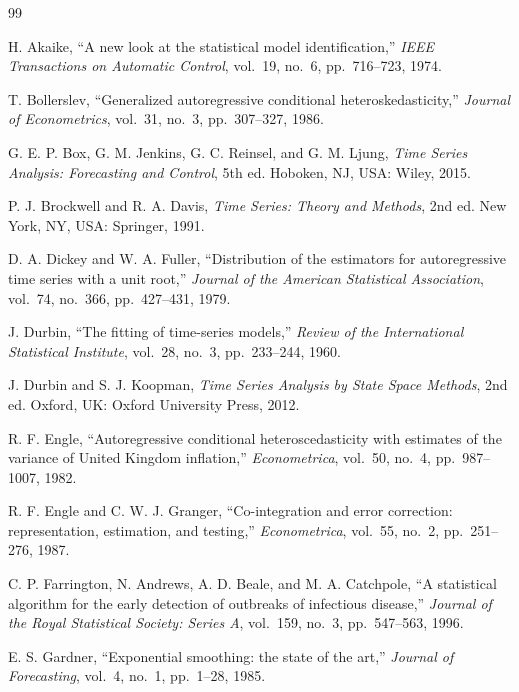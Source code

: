 \documentclass[conference]{IEEEtran}
\theoremstyle{definition}
\begin{document}

\begin{thebibliography}{99}

H. Akaike, ``A new look at the statistical model identification,''
\textit{IEEE Transactions on Automatic Control}, vol.~19, no.~6,
pp.~716--723, 1974.

T. Bollerslev, ``Generalized autoregressive conditional heteroskedasticity,''
\textit{Journal of Econometrics}, vol.~31, no.~3, pp.~307--327, 1986.

G. E. P. Box, G. M. Jenkins, G. C. Reinsel, and G. M. Ljung,
\textit{Time Series Analysis: Forecasting and Control}, 5th ed.
Hoboken, NJ, USA: Wiley, 2015.

P. J. Brockwell and R. A. Davis,
\textit{Time Series: Theory and Methods}, 2nd ed.
New York, NY, USA: Springer, 1991.

D. A. Dickey and W. A. Fuller, ``Distribution of the estimators for
autoregressive time series with a unit root,''
\textit{Journal of the American Statistical Association}, vol.~74,
no.~366, pp.~427--431, 1979.

J. Durbin, ``The fitting of time-series models,''
\textit{Review of the International Statistical Institute}, vol.~28,
no.~3, pp.~233--244, 1960.

J. Durbin and S. J. Koopman,
\textit{Time Series Analysis by State Space Methods}, 2nd ed.
Oxford, UK: Oxford University Press, 2012.

R. F. Engle, ``Autoregressive conditional heteroscedasticity with estimates
of the variance of United Kingdom inflation,''
\textit{Econometrica}, vol.~50, no.~4, pp.~987--1007, 1982.

R. F. Engle and C. W. J. Granger, ``Co-integration and error correction:
representation, estimation, and testing,''
\textit{Econometrica}, vol.~55, no.~2, pp.~251--276, 1987.

C. P. Farrington, N. Andrews, A. D. Beale, and M. A. Catchpole,
``A statistical algorithm for the early detection of outbreaks of
infectious disease,'' \textit{Journal of the Royal Statistical Society:
Series A}, vol.~159, no.~3, pp.~547--563, 1996.

E. S. Gardner, ``Exponential smoothing: the state of the art,''
\textit{Journal of Forecasting}, vol.~4, no.~1, pp.~1--28, 1985.


\end{thebibliography}
\end{document}
